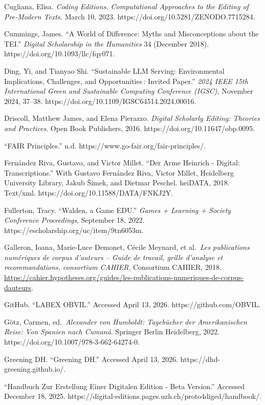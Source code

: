 \documentclass[
  letterpaper,
  DIV=11,
  numbers=noendperiod]{scrreprt}
\begin{document}
Cugliana, Elisa. \emph{Coding Editions. Computational Approaches to the
Editing of Pre-Modern Texts.} March 10, 2023.
https://doi.org/10.5281/ZENODO.7715284.

Cummings, James. ``A World of Difference: Myths and Misconceptions about
the TEI.'' \emph{Digital Scholarship in the Humanities} 34 (December
2018). https://doi.org/10.1093/llc/fqy071.

Ding, Yi, and Tianyao Shi. ``Sustainable LLM Serving: Environmental
Implications, Challenges, and Opportunities\,: Invited Paper.''
\emph{2024 IEEE 15th International Green and Sustainable Computing
Conference (IGSC)}, November 2024, 37--38.
https://doi.org/10.1109/IGSC64514.2024.00016.

Driscoll, Matthew James, and Elena Pierazzo. \emph{Digital Scholarly
Editing: Theories and Practices}. Open Book Publishers, 2016.
https://doi.org/10.11647/obp.0095.

``FAIR Principles.'' n.d. https://www.go-fair.org/fair-principles/.

Fernández Riva, Gustavo, and Victor Millet. ``Der Arme Heinrich -
Digital: Transcriptions.'' With Gustavo Fernández Riva, Victor Millet,
Heidelberg University Library, Jakub Šimek, and Dietmar Peschel.
heiDATA, 2018. Text/xml. https://doi.org/10.11588/DATA/FNKJ2Y.

Fullerton, Tracy. ``Walden, a Game EDU.'' \emph{Games + Learning +
Society Conference Proceedings}, September 18, 2022.
https://escholarship.org/uc/item/9tn6053m.

Galleron, Ioana, Marie-Luce Demonet, Cécile Meynard, et al.~\emph{Les
publications numériques de corpus d'auteurs -- Guide de travail, grille
d'analyse et recommandations, consortium CAHIER}. Consortium CAHIER,
2018.
\url{https://cahier.hypotheses.org/guides/les-publications-numeriques-de-corpus-dauteurs}.

GitHub. ``LABEX OBVIL.'' Accessed April 13, 2026.
https://github.com/OBVIL.

Götz, Carmen, ed.~\emph{Alexander von Humboldt: Tagebücher der
Amerikanischen Reise: Von Spanien nach Cumaná}. Springer Berlin
Heidelberg, 2022. https://doi.org/10.1007/978-3-662-64274-0.

Greening DH. ``Greening DH.'' Accessed April 13, 2026.
https://dhd-greening.github.io/.

``Handbuch Zur Erstellung Einer Digitalen Edition - Beta Version.''
Accessed December 18, 2025.
https://digital-editions.pages.uzh.ch/proto4diged/handbook/.
\end{document}
